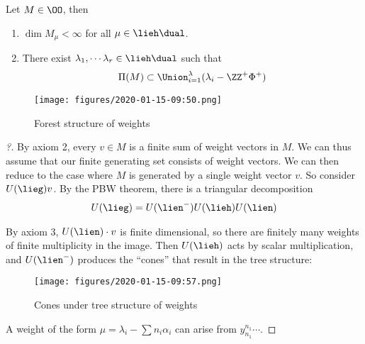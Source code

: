 \begin{lemma}[?]

Let \(M \in \OO\), then

\begin{enumerate}
\def\labelenumi{\arabic{enumi}.}
\setcounter{enumi}{3}
\tightlist
\item
  \(\dim M_\mu < \infty\) for all \(\mu \in \lieh\dual\).
\item
  There exist \(\lambda_1, \cdots \lambda_r \in \lieh\dual\) such that
  \begin{align*}
  \Pi(M) \subset \Union_{i=1}^\lambda (\lambda_i - \ZZ^+ \Phi^+)
  \end{align*}
\end{enumerate}

\begin{figure}
\centering
\texttt{[image: figures/2020-01-15-09:50.png]}
\caption{Forest structure of weights}
\end{figure}

\end{lemma}

\begin{proof}[?]

By axiom 2, every \(v\in M\) is a finite sum of weight vectors in \(M\).
We can thus assume that our finite generating set consists of weight
vectors. We can then reduce to the case where \(M\) is generated by a
single weight vector \(v\). So consider \(U(\lieg) v\). By the PBW
theorem, there is a triangular decomposition
\begin{align*}
U(\lieg) = U(\lien^-) U(\lieh) U(\lien)
\end{align*}

By axiom 3, \(U(\lien) \cdot v\) is finite dimensional, so there are
finitely many weights of finite multiplicity in the image. Then
\(U(\lieh)\) acts by scalar multiplication, and \(U(\lien^-)\) produces
the ``cones'' that result in the tree structure:

\begin{figure}
\centering
\texttt{[image: figures/2020-01-15-09:57.png]}
\caption{Cones under tree structure of weights}
\end{figure}

A weight of the form \(\mu = \lambda_i - \sum n_i \alpha_i\) can arise
from \(y_{n_1}^{n_1} \cdots\).


\end{proof}

